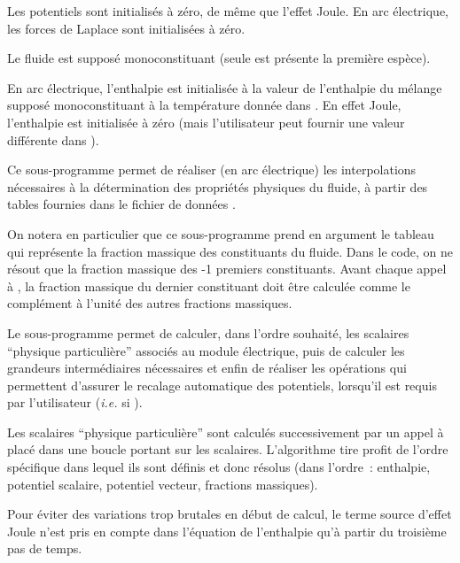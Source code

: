 Les potentiels sont initialis\'es \`a z\'ero, de m\^eme que l'effet Joule. En
arc \'electrique, les forces de Laplace sont initialis\'ees \`a z\'ero. 

Le fluide est suppos\'e monoconstituant (seule est pr\'esente la premi\`ere
esp\`ece). 

En arc \'electrique, l'enthalpie est initialis\'ee \`a la valeur de l'enthalpie du m\'elange
suppos\'e monoconstituant \`a la temp\'erature  donn\'ee
dans .  En effet Joule, l'enthalpie est initialis\'ee \`a z\'ero
(mais l'utilisateur peut fournir une valeur diff\'erente dans ).  


Ce sous-programme permet de r\'ealiser (en arc \'electrique) les interpolations
n\'ecessaires \`a la d\'e\-ter\-mi\-na\-tion des propri\'et\'es physiques du fluide, \`a
partir des tables fournies dans le fichier de donn\'ees . 

On notera en particulier que ce sous-programme prend en argument le tableau
 qui repr\'esente la fraction massique des 
constituants du fluide. Dans le code, on ne r\'esout que la fraction massique
des -1 premiers constituants. Avant chaque appel \`a ,
la fraction massique du dernier constituant doit \^etre calcul\'ee comme le
compl\'ement \`a l'unit\'e des autres fractions massiques.
 

Le sous-programme  permet de calculer, dans l'ordre souhait\'e,  
les  scalaires ``physique particuli\`ere'' associ\'es au module
\'electrique, puis de calculer les grandeurs interm\'ediaires n\'e\-ces\-sai\-res et
enfin de
r\'ealiser les op\'erations qui permettent d'assurer le recalage automatique 
des potentiels, lorsqu'il est requis par l'utilisateur ({\it i.e.} si ). 

Les  scalaires ``physique particuli\`ere'' sont calcul\'es successivement par un
appel \`a  plac\'e dans une boucle portant sur les 
scalaires. L'algorithme tire profit de l'ordre sp\'ecifique dans lequel ils sont d\'efinis et donc
r\'esolus (dans l'ordre~: enthalpie, potentiel scalaire, potentiel vecteur, fractions massiques). 

Pour \'eviter des variations trop brutales en d\'ebut de calcul, le terme source
d'effet Joule n'est pris en compte dans l'\'equation de l'enthalpie qu'\`a
partir du troisi\`eme pas de temps.


